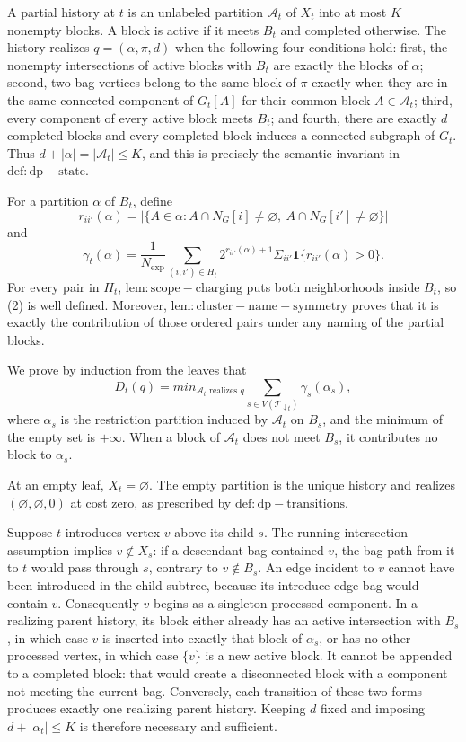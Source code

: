 A partial history at \(t\) is an unlabeled partition \(\mathscr A_t\) of \(X_t\) into at most \(K\) nonempty blocks.  A block is active if it meets \(B_t\) and completed otherwise.  The history realizes \(q=(\alpha,\pi,d)\) when the following four conditions hold: first, the nonempty intersections of active blocks with \(B_t\) are exactly the blocks of \(\alpha\); second, two bag vertices belong to the same block of \(\pi\) exactly when they are in the same connected component of \(G_t[A]\) for their common block \(A\in\mathscr A_t\); third, every component of every active block meets \(B_t\); and fourth, there are exactly \(d\) completed blocks and every completed block induces a connected subgraph of \(G_t\).  Thus \(d+|\alpha|=|\mathscr A_t|\le K\), and this is precisely the semantic invariant in \(\mathrm{def:dp-state}\).

For a partition \(\alpha\) of \(B_t\), define
\[
 r_{ii'}(\alpha)=
 \bigl|\{A\in\alpha:A\cap N_G[i]\ne\varnothing,
                         \ A\cap N_G[i']\ne\varnothing\}\bigr|
\]
and
\[
 \gamma_t(\alpha)=\frac{1}{N_{\exp}}
 \sum_{(i,i')\in H_t}
 2^{r_{ii'}(\alpha)+1}\Sigma_{ii'}
 \mathbf 1\{r_{ii'}(\alpha)>0\}.
\tag{2}
\]
For every pair in \(H_t\), \(\mathrm{lem:scope-charging}\) puts both neighborhoods inside \(B_t\), so (2) is well defined.  Moreover, \(\mathrm{lem:cluster-name-symmetry}\) proves that it is exactly the contribution of those ordered pairs under any naming of the partial blocks.

We prove by induction from the leaves that
\[
 D_t(q)=min_{\mathscr A_t\text{ realizes }q}
 \sum_{s\in V(\mathcal T_{\downarrow t})}
 \gamma_s(\alpha_s),
\tag{3}
\]
where \(\alpha_s\) is the restriction partition induced by \(\mathscr A_t\) on \(B_s\), and the minimum of the empty set is \(+\infty\).  When a block of \(\mathscr A_t\) does not meet \(B_s\), it contributes no block to \(\alpha_s\).

At an empty leaf, \(X_t=\varnothing\).  The empty partition is the unique history and realizes \((\varnothing,\varnothing,0)\) at cost zero, as prescribed by \(\mathrm{def:dp-transitions}\).

Suppose \(t\) introduces vertex \(v\) above its child \(s\).  The running-intersection assumption implies \(v\notin X_s\): if a descendant bag contained \(v\), the bag path from it to \(t\) would pass through \(s\), contrary to \(v\notin B_s\).  An edge incident to \(v\) cannot have been introduced in the child subtree, because its introduce-edge bag would contain \(v\).  Consequently \(v\) begins as a singleton processed component.  In a realizing parent history, its block either already has an active intersection with \(B_s\), in which case \(v\) is inserted into exactly that block of \(\alpha_s\), or has no other processed vertex, in which case \(\{v\}\) is a new active block.  It cannot be appended to a completed block: that would create a disconnected block with a component not meeting the current bag.  Conversely, each transition of these two forms produces exactly one realizing parent history.  Keeping \(d\) fixed and imposing \(d+|\alpha_t|\le K\) is therefore necessary and sufficient.

